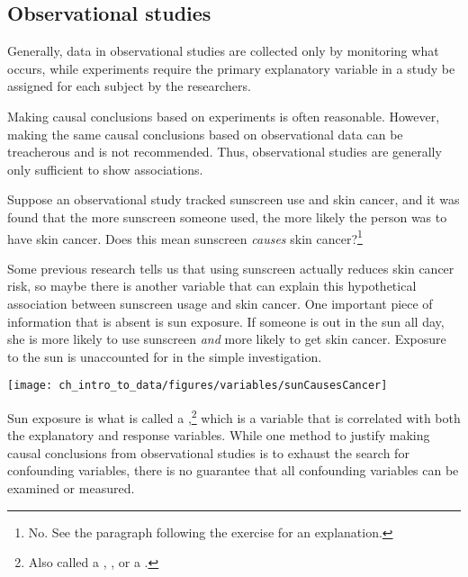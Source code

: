 \subsection{Observational studies}

Generally, data in observational studies are collected only by monitoring what occurs, while experiments require the primary explanatory variable in a study be assigned for each subject by the researchers.

Making causal conclusions based on experiments is often reasonable. However, making the same causal conclusions based on observational data can be treacherous and is not recommended. Thus, observational studies are generally only sufficient to show associations.

\begin{exercise} \label{sunscreenLurkingExample}
Suppose an observational study tracked sunscreen use and skin cancer, and it was found that the more sunscreen someone used, the more likely the person was to have skin cancer. Does this mean sunscreen \emph{causes} skin cancer?\footnote{No. See the paragraph following the exercise for an explanation.}
\end{exercise}

Some previous research tells us that using sunscreen actually reduces skin cancer risk, so maybe there is another variable that can explain this hypothetical association between sunscreen usage and skin cancer. One important piece of information that is absent is sun exposure. If someone is out in the sun all day, she is more likely to use sunscreen \emph{and} more likely to get skin cancer. Exposure to the sun is unaccounted for in the simple investigation.
\begin{center}
\texttt{[image: ch\_intro\_to\_data/figures/variables/sunCausesCancer]}
\end{center}

Sun exposure is what is called a ,\footnote{Also called a , , or a .} which is a variable that is correlated with both the explanatory and response variables. While one method to justify making causal conclusions from observational studies is to exhaust the search for confounding variables, there is no guarantee that all confounding variables can be examined or measured.

